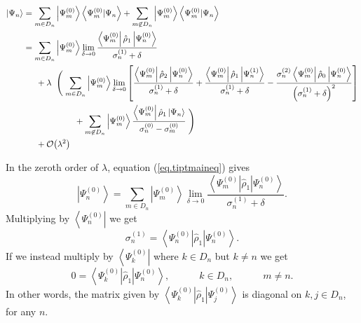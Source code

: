 \documentclass[11pt]{article}
\newcommand{\Od}[1]{\mathcal{O}{\left(#1\right)}}
\newcommand{\bra}[1]{\left\langle#1\right|}
\newcommand{\ket}[1]{\left|#1\right\rangle}
\newcommand{\braket}[2]{\left\langle#1|#2\right\rangle}
\newcommand{\op}[1]{\hat{#1}}
\theoremstyle{theorem}
\theoremstyle{remark}
\theoremstyle{step}
\theoremstyle{gap}
\begin{document}
\begin{align}\label{eq.tiptmaineq}
\ket{\Psi_n} &= \sum_{m \in D_n} \ket{\Psi_m^{(0)}} \braket{\Psi_m^{(0)}}{\Psi_n} + \sum_{m \not\in D_n} \ket{\Psi_m^{(0)}} \braket{\Psi_m^{(0)}}{\Psi_n} \\
&= \sum_{m \in D_n} \ket{\Psi_m^{(0)}} \lim_{\delta\to 0} \frac{\bra{\Psi_m^{(0)}} \op{\rho}_1 \ket{\Psi_n^{(0)}}}{\sigma_n^{(1)} + \delta}
\nonumber\\&\hspace{1.5em}+ \lambda\;\;
\Biggl(\;\sum_{m \in D_n} \ket{\Psi_m^{(0)}} \lim_{\delta \to 0}\left[\frac{\bra{\Psi_m^{(0)}}\op{\rho}_2\ket{\Psi_n^{(0)}}}{\sigma_n^{(1)} + \delta} + \frac{\bra{\Psi_m^{(0)}}\op{\rho}_1\ket{\Psi_n^{(1)}}}{\sigma_n^{(1)} + \delta} - \frac{\sigma_n^{(2)}\bra{\Psi_m^{(0)}}\op{\rho}_0\ket{\Psi_n^{(0)}}}{\left(\sigma_n^{(1)} + \delta\right)^2}\right] 
\nonumber\\&\hspace{6em}+ \sum_{m \not\in D_n} \ket{\Psi_m^{(0)}}\frac{\bra{\Psi_m^{(0)}} \op{\rho}_1 \ket{\Psi_n}}{\sigma_n^{(0)} - \sigma_m^{(0)}}
\;\Biggr)
\nonumber\\&\hspace{1.5em}+ \Od{\lambda^2}\nonumber
\end{align}

In the zeroth order of \(\lambda\), equation (\ref{eq.tiptmaineq}) gives
\[
\ket{\Psi_n^{(0)}} = \sum_{m \in D_n} \ket{\Psi_m^{(0)}} \lim_{\delta\to0}\frac{\bra{\Psi_m^{(0)}} \op{\rho}_1 \ket{\Psi_n^{(0)}}}{\sigma_n^{(1)} + \delta}.
\]
Multiplying by \(\bra{\Psi_n^{(0)}}\) we get
\begin{equation}\label{eq.tipt.foval}
\boxed{\sigma_n^{(1)} = \bra{\Psi_n^{(0)}}\op{\rho}_1\ket{\Psi_n^{(0)}}.}
\end{equation}
If we instead multiply by \(\bra{\Psi_k^{(0)}}\) where \(k \in D_n\) but \(k \neq n\) we get
\begin{equation}\label{eq.tipt.fodiag}
\boxed{0 = \bra{\Psi_k^{(0)}}\op{\rho}_1\ket{\Psi_n^{(0)}}, \hspace{3em} k \in D_n,\hspace{3em} m \neq n.}
\end{equation}
In other words, the matrix given by \(\bra{\Psi_k^{(0)}}\op{\rho}_1\ket{\Psi_j^{(0)}}\) is diagonal on \(k,j\in D_n\), for any \(n\).
\end{document}
